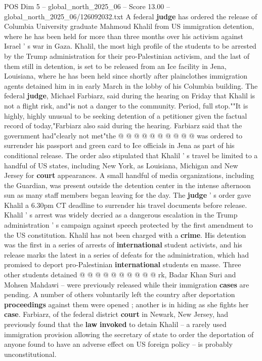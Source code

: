 \begin{textsample}{POS Dim 5 – global\_north\_2025\_06 – Score 13.00 – global\_north\_2025\_06/126092032.txt}  \label{ex:f5_pos_089}
A federal \textbf{judge} has ordered the release of Columbia University graduate Mahmoud Khalil from US immigration detention, where he has been held for more than three months over his activism against Israel ' s war in Gaza.
Khalil, the most high profile of the students to be arrested by the Trump administration for their pro-Palestinian activism, and the last of them still in detention, is set to be released from an Ice facility in Jena, Louisiana, where he has been held since shortly after plainclothes immigration agents detained him in in early March in the lobby of his Columbia building.
The federal \textbf{judge}, Michael Farbiarz, said during the hearing on Friday that Khalil is not a flight risk, and"is not a danger to the community.
Period, full stop.""It is highly, highly unusual to be seeking detention of a petitioner given the factual record of today,"Farbiarz also said during the hearing.
Farbiarz said that the government had"clearly not met"the @ @ @ @ @ @ @ @ @ @ was ordered to surrender his passport and green card to Ice officials in Jena as part of his conditional release.
The order also stipulated that Khalil ' s travel be limited to a handful of US states, including New York, as Louisiana, Michigan and New Jersey for \textbf{court} appearances.
A small handful of media organizations, including the Guardian, was present outside the detention center in the intense afternoon sun as many staff members began leaving for the day.
The \textbf{judge} ' s order gave Khalil a 6.30pm CT deadline to surrender his travel documents before release.
Khalil ' s arrest was widely decried as a dangerous escalation in the Trump administration ' s campaign against speech protected by the first amendment to the US constitution.
Khalil has not been charged with a \textbf{crime}.
His detention was the first in a series of arrests of \textbf{international} student activists, and his release marks the latest in a series of defeats for the administration, which had promised to deport pro-Palestinian \textbf{international} students en masse.
Three other students detained @ @ @ @ @ @ @ @ @ @ rk, Badar Khan Suri and Mohsen Mahdawi -- were previously released while their immigration \textbf{cases} are pending.
A number of others voluntarily left the country after deportation \textbf{proceedings} against them were opened ; another is in hiding as she fights her \textbf{case}.
Farbiarz, of the federal district \textbf{court} in Newark, New Jersey, had previously found that the \textbf{law} \textbf{invoked} to detain Khalil -- a rarely used immigration provision allowing the secretary of state to order the deportation of anyone found to have an adverse effect on US foreign policy -- is probably unconstitutional.

\end{textsample}
